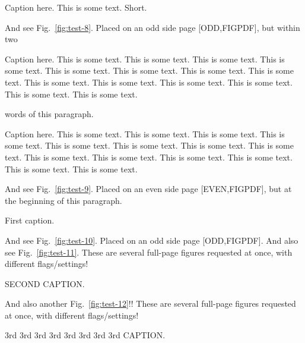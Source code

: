 \documentclass[12pt,a5paper]{book}
\begin{document}
\begin{fullpagefigure}
  \figcapmaxheight{10em}
  \caption{Caption here. This is some text. Short.}
  \label{fig:test-7}
\end{fullpagefigure}

\lipsum[5-11]


\cleardoublepage
\lipsum[1-3]

{\def\FloatBarrier{}
And see Fig.~\ref{fig:test-8}. Placed on an odd side page [ODD,FIGPDF], but within two%
%
\begin{fullpagefigure}
  \caption{Caption here. This is some text. This is some text. This is some text. This is
    some text. This is some text. This is some text. This is some text. This is some
    text. This is some text. This is some text. This is some text. This is some text. This
    is some text. This is some text. }
  \label{fig:test-8}
\end{fullpagefigure}%
%
words of this paragraph.}

\lipsum[5-7]

\cleardoublepage
\lipsum[1-3]

\begin{fullpagefigure}
  \caption{Caption here. This is some text. This is some text. This is some text. This is
    some text. This is some text. This is some text. This is some text. This is some
    text. This is some text. This is some text. This is some text. This is some text. This
    is some text. This is some text. }
  \label{fig:test-9}
\end{fullpagefigure}
And see Fig.~\ref{fig:test-9}. Placed on an even side page [EVEN,FIGPDF], but at the
beginning of this paragraph.

\lipsum[5-7]


\cleardoublepage
\lipsum[1-3]

\begin{fullpagefigure}
  \caption{First caption.}
  \label{fig:test-10}
\end{fullpagefigure}
And see Fig.~\ref{fig:test-10}. Placed on an odd side page [ODD,FIGPDF].
And also see Fig.~\ref{fig:test-11}.  These are several full-page figures requested at
once, with different flags/settings!
\begin{fullpagefigure}
  \caption{SECOND CAPTION.}
  \label{fig:test-11}
\end{fullpagefigure}
And also another Fig.~\ref{fig:test-12}!!  These are several full-page figures requested at
once, with different flags/settings!
\begin{fullpagefigure}
  \caption{3rd 3rd 3rd 3rd 3rd 3rd 3rd 3rd CAPTION.}
  \label{fig:test-12}
\end{fullpagefigure}

\lipsum[5-20]
\end{document}
